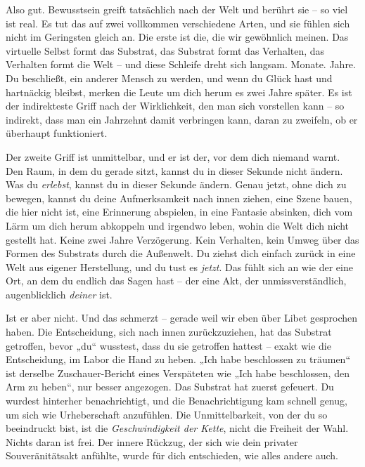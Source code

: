 \documentclass[11pt, twoside, openright]{book}
\begin{document}
Also gut. Bewusstsein greift tatsächlich nach der Welt und berührt sie -- so viel ist real. Es tut das auf zwei vollkommen verschiedene Arten, und sie fühlen sich nicht im Geringsten gleich an. Die erste ist die, die wir gewöhnlich meinen. Das virtuelle Selbst formt das Substrat, das Substrat formt das Verhalten, das Verhalten formt die Welt -- und diese Schleife dreht sich langsam. Monate. Jahre. Du beschließt, ein anderer Mensch zu werden, und wenn du Glück hast und hartnäckig bleibst, merken die Leute um dich herum es zwei Jahre später. Es ist der indirekteste Griff nach der Wirklichkeit, den man sich vorstellen kann -- so indirekt, dass man ein Jahrzehnt damit verbringen kann, daran zu zweifeln, ob er überhaupt funktioniert.

Der zweite Griff ist unmittelbar, und er ist der, vor dem dich niemand warnt. Den Raum, in dem du gerade sitzt, kannst du in dieser Sekunde nicht ändern. Was du \textit{erlebst}, kannst du in dieser Sekunde ändern. Genau jetzt, ohne dich zu bewegen, kannst du deine Aufmerksamkeit nach innen ziehen, eine Szene bauen, die hier nicht ist, eine Erinnerung abspielen, in eine Fantasie absinken, dich vom Lärm um dich herum abkoppeln und irgendwo leben, wohin die Welt dich nicht gestellt hat. Keine zwei Jahre Verzögerung. Kein Verhalten, kein Umweg über das Formen des Substrats durch die Außenwelt. Du ziehst dich einfach zurück in eine Welt aus eigener Herstellung, und du tust es \textit{jetzt}. Das fühlt sich an wie der eine Ort, an dem du endlich das Sagen hast -- der eine Akt, der unmissverständlich, augenblicklich \textit{deiner} ist.

Ist er aber nicht. Und das schmerzt -- gerade weil wir eben über Libet gesprochen haben. Die Entscheidung, sich nach innen zurückzuziehen, hat das Substrat getroffen, bevor „du“ wusstest, dass du sie getroffen hattest -- exakt wie die Entscheidung, im Labor die Hand zu heben. „Ich habe beschlossen zu träumen“ ist derselbe Zuschauer-Bericht eines Verspäteten wie „Ich habe beschlossen, den Arm zu heben“, nur besser angezogen. Das Substrat hat zuerst gefeuert. Du wurdest hinterher benachrichtigt, und die Benachrichtigung kam schnell genug, um sich wie Urheberschaft anzufühlen. Die Unmittelbarkeit, von der du so beeindruckt bist, ist die \textit{Geschwindigkeit der Kette}, nicht die Freiheit der Wahl. Nichts daran ist frei. Der innere Rückzug, der sich wie dein privater Souveränitätsakt anfühlte, wurde für dich entschieden, wie alles andere auch.
\end{document}
